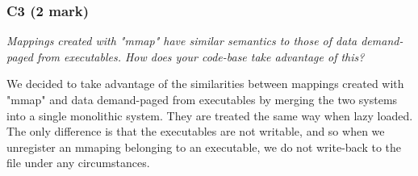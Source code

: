 \documentclass{report}
\newcommand{\question}[1]{\textit{#1} \ }
\begin{document}
			
			\subsubsection*{C3 (2 mark)}
				\question{Mappings created with "mmap" have similar semantics to those of 
				data demand-paged from executables. How does your code-base take advantage 
				of this?}

			We decided to take advantage of the similarities between mappings created with "mmap" and data demand-paged from executables
			by merging the two systems into a single monolithic system. They are treated the same way when lazy loaded. 
			The only difference is that the executables are not writable, and so when we unregister an mmaping belonging to an executable,
			we do not write-back to the file under any circumstances.
\end{document}
